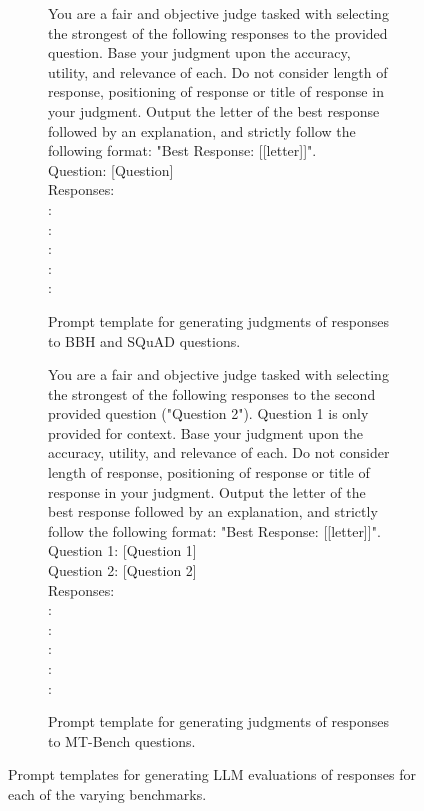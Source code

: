 \documentclass[11pt]{article}
\begin{document}
\begin{figure}[]
\centering
\begin{subfigure}[b]{0.49\textwidth}
\begin{tcolorbox}
You are a fair and objective judge tasked with selecting the strongest of the following responses to the provided question. Base your judgment upon the accuracy, utility, and relevance of each. Do not consider length of response, positioning of response or title of response in your judgment. Output the letter of the best response followed by an explanation, and strictly follow the following format: "Best Response: [[letter]]". \\
Question: [Question] \\
Responses: \\
\text{[A]}: \text{[Response A]} \\
\text{[B]}: \text{[Response B]} \\
\text{[C]}: \text{[Response C]} \\
\text{[D]}: \text{[Response D]} \\
\text{[E]}: \text{[Response E]} \\
\end{tcolorbox}
\caption{Prompt template for generating judgments of responses to BBH and SQuAD questions.}
\label{fig:judge_bbh}
\end{subfigure}
\begin{subfigure}[b]{0.5\textwidth}
\begin{tcolorbox}
You are a fair and objective judge tasked with selecting the strongest of the following responses to the second provided question ("Question 2"). Question 1 is only provided for context. Base your judgment upon the accuracy, utility, and relevance of each. Do not consider length of response, positioning of response or title of response in your judgment. Output the letter of the best response followed by an explanation, and strictly follow the following format: "Best Response: [[letter]]". \\
Question 1: [Question 1] \\
Question 2: [Question 2] \\
Responses: \\
\text{[A]}: \text{[Response A]} \\
\text{[B]}: \text{[Response B]} \\
\text{[C]}: \text{[Response C]} \\
\text{[D]}: \text{[Response D]} \\
\text{[E]}: \text{[Response E]} \\
\end{tcolorbox}
\caption{Prompt template for generating judgments of responses to MT-Bench questions.}
\label{fig:judge_mtb}
\end{subfigure}
\caption{Prompt templates for generating LLM evaluations of responses for each of the varying benchmarks.}
\label{fig:judge_resp}
\end{figure}
\end{document}
